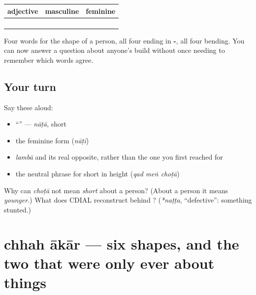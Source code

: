 \begin{grammarlens}[title={Grammar Lens: the fourth of four, and the rule has not moved}]
\noindent
\begin{tabularx}{\linewidth}{@{}>{\raggedright\arraybackslash}X>{\raggedright\arraybackslash}X>{\raggedright\arraybackslash}X@{}}
\toprule
\textbf{adjective} & \textbf{masculine} & \textbf{feminine} \\
\midrule
\hi{लंबा} & \hi{लंबा} & \hi{लंबी} \\
\hi{पतला} & \hi{पतला} & \hi{पतली} \\
\hi{मोटा} & \hi{मोटा} & \hi{मोटी} \\
\hi{नाटा} & \hi{नाटा} & \hi{नाटी} \\
\bottomrule
\end{tabularx}

Four words for the shape of a person, all four ending in \textbf{-}, all four bending. You can now answer a question about anyone's build without once needing to remember which words agree.
\end{grammarlens}

\subsection*{Your turn}
Say these aloud:

\begin{itemize}
\raggedright
  \item \textquotedblleft{}\textquotedblright{} — \emph{nāṭā}, short
  \item the feminine form (\emph{nāṭī})
  \item \emph{lambā} and its real opposite, rather than the one you first reached for
  \item the neutral phrase for short in height (\emph{qad meṅ choṭā})
\end{itemize}

\begin{tcolorbox}[breakable,colback=teal!4,colframe=teal!35!black,title={Before you move on}]
Why can \emph{choṭā} not mean \emph{short} about a person? (About a person it means \emph{younger}.) What does CDIAL reconstruct behind \textbf{}? (\emph{*naṭṭa}, \textquotedblleft{}defective\textquotedblright{}: something stunted.)
\end{tcolorbox}
\section[\texorpdfstring{\hi{बड़ा}, \hi{छोटा}, \hi{लंबा} … (baṛā, choṭā …)}{बड़ा, छोटा, लंबा … (baṛā, choṭā …)}]{chhah ākār — six shapes, and the two that were only ever about things}

